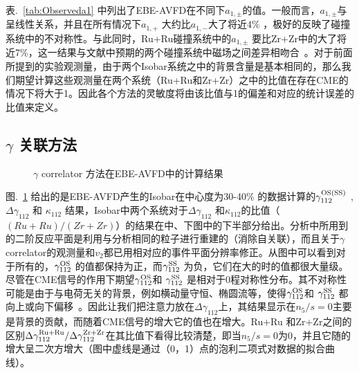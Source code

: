 表.~\ref{tab:Observeda1} 中列出了EBE-AVFD在不同\ns 下$a_{1,\pm}$的值。一般而言，$a_{1,\pm}$与\ns 呈线性关系，并且在所有情况下$a_{1,+}$ 
大约比$a_{1,-}$大了将近$4\%$ ，极好的反映了碰撞系统中的不对称性。与此同时，Ru+Ru碰撞系统中的$a_{1,\pm}$ 要比Zr+Zr中的大了将近7\%，这一结果与文献中预期的两个碰撞系统中磁场之间差异相吻合~\cite{isobar1}。对于前面所提到的实验观测量，由于两个Isobar系统之中的背景含量是基本相同的，那么我们期望计算这些观测量在两个系统（Ru+Ru和Zr+Zr）之中的比值在存在CME的情况下将大于1。因此各个方法的灵敏度将由该比值与1的偏差和对应的统计误差的比值来定义。


\subsection{$\gamma$ 关联方法}

\begin{figure}[t]
\hspace{-1.5cm}
\centering
\caption{$\gamma$ correlator 方法在EBE-AVFD中的计算结果}
\label{gamma_isobar}
\end{figure}

图.~\ref{gamma_isobar} 给出的是EBE-AVFD产生的Isobar在中心度为30-40\% 的数据计算的$\gamma_{112}^{\rm OS(SS)}$ , $\Delta \gamma_{112}$  和 $\kappa_{112}$ 结果，Isobar中两个系统对于$\Delta \gamma_{112}$ 和$\kappa_{112}$的比值（$(Ru+Ru)/(Zr+Zr)$）的结果在中、下图中的下半部分给出。分析中所用到的二阶反应平面是利用与分析相同的粒子进行重建的（消除自关联），而且关于$\gamma$ correlator的观测量和$v_2$都已用相对应的事件平面分辨率修正。从图中可以看到对于所有的\ns ，$\gamma_{112}^{\rm OS}$ 的值都保持为正，而$\gamma_{112}^{\rm SS}$ 为负，它们在大的\ns 时的值都很大量级。尽管在CME信号的作用下期望$\gamma_{112}^{\rm OS}$和 $\gamma_{112}^{\rm SS}$ 是相对于0程对称性分布。其不对称性可能是由于与电荷无关的背景，例如横动量守恒、椭圆流等，使得$\gamma_{112}^{\rm OS}$和 $\gamma_{112}^{\rm SS}$ 都向上或向下偏移~\cite{STAR3}。因此让我们把注意力放在$\Delta\gamma_{112}$上，其结果显示在$n_5/s=0$主要是背景的贡献，而随着CME信号的增大它的值也在增大。Ru+Ru 和Zr+Zr之间的区别$\Delta\gamma_{112}^{\rm Ru+Ru}/\Delta\gamma_{112}^{\rm Zr+Zr}$在其比值下看得比较清楚，即当$n_5/s=0$为0，并且它随\ns 的增大呈二次方增大（图中虚线是通过（0，1）点的泡利二项式对数据的拟合曲线）。


